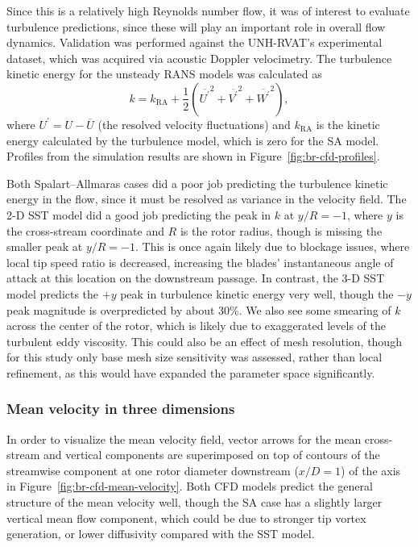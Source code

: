 \documentclass[aip,graphicx]{revtex4-1}
\begin{document}
Since this is a relatively high Reynolds number flow, it was of interest to
evaluate turbulence predictions, since these will play an important role in
overall flow dynamics. Validation was performed against the UNH-RVAT's
experimental dataset, which was acquired via acoustic Doppler velocimetry. The
turbulence kinetic energy for the unsteady RANS models was calculated as
\begin{equation}
    k = k_{\mathrm{RA}} + \frac{1}{2} \left(
    \overline{U^\prime}^2 +
    \overline{V^\prime}^2 +
    \overline{W^\prime}^2 \right),
    \label{eq:k}
\end{equation}
where $U^\prime = U - \overline{U}$ (the resolved velocity fluctuations) and
$k_{\mathrm{RA}}$ is the kinetic energy calculated by the turbulence model,
which is zero for the SA model. Profiles from the simulation results are shown
in Figure~\ref{fig:br-cfd-profiles}.

Both Spalart--Allmaras cases did a poor job predicting the turbulence kinetic
energy in the flow, since it must be resolved as variance in the velocity field.
The 2-D SST model did a good job predicting the peak in $k$ at $y/R=-1$, where
$y$ is the cross-stream coordinate and $R$ is the rotor radius, though is
missing the smaller peak at $y/R=-1$. This is once again likely due to blockage
issues, where local tip speed ratio is decreased, increasing the blades'
instantaneous angle of attack at this location on the downstream passage. In
contrast, the 3-D SST model predicts the $+y$ peak in turbulence kinetic energy
very well, though the $-y$ peak magnitude is overpredicted by about 30\%. We
also see some smearing of $k$ across the center of the rotor, which is likely
due to exaggerated levels of the turbulent eddy viscosity. This could also be an
effect of mesh resolution, though for this study only base mesh size sensitivity
was assessed, rather than local refinement, as this would have expanded the
parameter space significantly.


\subsubsection{Mean velocity in three dimensions}

In order to visualize the mean velocity field, vector arrows for the mean
cross-stream and vertical components are superimposed on top of contours of the
streamwise component at one rotor diameter downstream ($x/D=1$) of the axis in
Figure~\ref{fig:br-cfd-mean-velocity}. Both CFD models predict the general
structure of the mean velocity well, though the SA case has a slightly larger
vertical mean flow component, which could be due to stronger tip vortex
generation, or lower diffusivity compared with the SST model.
\end{document}
